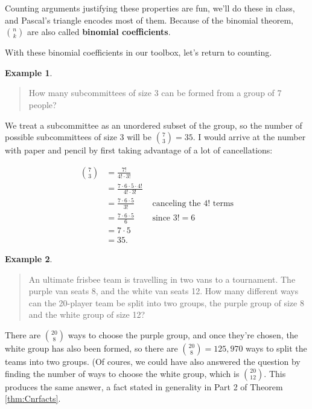 \documentclass[
]{book}
\theoremstyle{definition}
\theoremstyle{definition}
\newtheorem{example}{Example}[chapter]
\theoremstyle{definition}
\theoremstyle{definition}
\theoremstyle{remark}
\begin{document}
Counting arguments justifying these properties are fun, we'll do these in class, and Pascal's triangle encodes most of them. Because of the binomial theorem, \(\displaystyle \binom{n}{k}\) are also called \textbf{binomial coefficients}.

With these binomial coefficients in our toolbox, let's return to counting.

\begin{example}
\protect\hypertarget{exm:cnr-subcommittees}{}\label{exm:cnr-subcommittees}\leavevmode

\begin{quote}
How many subcommittees of size 3 can be formed from a group of 7 people?
\end{quote}

We treat a subcommittee as an unordered subset of the group, so the number of possible subcommittees of size 3 will be \(\binom{7}{3} = 35\). I would arrive at the number with paper and pencil by first taking advantage of a lot of cancellations:

\begin{align*}
\binom{7}{3} &= \frac{7!}{4! \cdot 3!}\\
 &= \frac{7\cdot 6 \cdot 5 \cdot 4!}{4! \cdot 3!}\\
 &= \frac{7\cdot 6 \cdot 5}{3!} &\text{ canceling the } 4! \text{ terms}\\
 &= \frac{7\cdot 6 \cdot 5}{6} &\text{ since } 3! = 6\\
 &= 7 \cdot 5 \\
 &= 35.
\end{align*}

\end{example}

\begin{example}
\protect\hypertarget{exm:cnr-2-ultimate-vans}{}\label{exm:cnr-2-ultimate-vans}\leavevmode

\begin{quote}
An ultimate frisbee team is travelling in two vans to a tournament. The purple van seats 8, and the white van seats 12. How many different ways can the 20-player team be split into two groups, the purple group of size 8 and the white group of size 12?
\end{quote}

There are \(\binom{20}{8}\) ways to choose the purple group, and once they're chosen, the white group has also been formed, so there are \(\binom{20}{8} = 125,970\) ways to split the teams into two groups. (Of coures, we could have also answered the question by finding the number of ways to choose the white group, which is \(\binom{20}{12}\). This produces the same answer, a fact stated in generality in Part 2 of Theorem \ref{thm:Cnrfacts}.

\end{example}
\end{document}
